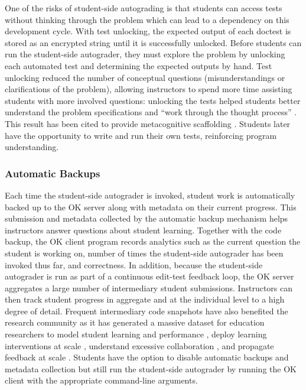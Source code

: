 One of the risks of student-side autograding is that students can access tests without thinking through the problem which can lead to a dependency on this development cycle. With test unlocking, the expected output of each doctest is stored as an encrypted string until it is successfully unlocked. Before students can run the student-side autograder, they must explore the problem by unlocking each automated test and determining the expected outputs by hand. Test unlocking reduced the number of conceptual questions (misunderstandings or clarifications of the problem), allowing instructors to spend more time assisting students with more involved questions: unlocking the tests helped students better understand the problem specifications and ``work through the thought process'' \cite{Basu:2015}. This result has been cited to provide metacognitive scaffolding \cite{Prather:2019}. Students later have the opportunity to write and run their own tests, reinforcing program understanding.

\subsubsection{Automatic Backups}

Each time the student-side autograder is invoked, student work is automatically backed up to the OK server along with metadata on their current progress. This submission and metadata collected by the automatic backup mechanism helps instructors answer questions about student learning. Together with the code backup, the OK client program records analytics such as the current question the student is working on, number of times the student-side autograder has been invoked thus far, and correctness. In addition, because the student-side autograder is run as part of a continuous edit-test feedback loop, the OK server aggregates a large number of intermediary student submissions. Instructors can then track student progress in aggregate and at the individual level to a high degree of detail. Frequent intermediary code snapshots have also benefited the research community as it has generated a massive dataset for education researchers to model student learning and performance \cite{Piech:2012, Wang:2017, Liao:2019}, deploy learning interventions at scale \cite{Sridhara:2016, Phothilimthana:2017}, understand excessive collaboration \cite{Yan:2018}, and propagate feedback at scale \cite{Yan:2019, Glassman:2015}. Students have the option to disable automatic backups and metadata collection but still run the student-side autograder by running the OK client with the appropriate command-line arguments.

